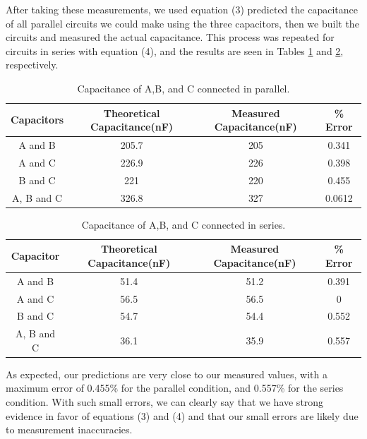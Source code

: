 \documentclass[oneside,12pt]{amsart}
\begin{document}
	\indent After taking these measurements, we used equation (3) predicted the capacitance of all parallel circuits we could make using the three capacitors, then we built the circuits and measured the actual capacitance. This process was repeated for circuits in series with equation (4), and the results are seen in Tables \ref{inParallel} and \ref{inSeries}, respectively. 
	\begin{table}[H]
		\begin{tabular}{ |c|c|c|c|}
			\hline
			Capacitors & Theoretical Capacitance(nF)& Measured Capacitance(nF) &\% Error\\
			\hline
			A and B	&205.7&205&0.341\\
			A and C&226.9 & 226&0.398\\
			B and C&221&220&0.455\\
			A, B and C&326.8&327&0.0612\\
			\hline
		\end{tabular}
		\caption{Capacitance of A,B, and C connected in parallel.}
		\label{inParallel}
	\end{table}

\begin{table}[H]
	\begin{tabular}{ |c|c|c|c|}
		\hline
		Capacitor & Theoretical Capacitance(nF)& Measured Capacitance(nF) &\% Error\\
		\hline
		A and B&51.4&51.2&0.391\\
		A and C&56.5&56.5&0\\
		B and C&54.7&54.4&0.552\\
		A, B and C&36.1&35.9&0.557\\
		\hline
	\end{tabular}
	\caption{Capacitance of A,B, and C connected in series.}
	\label{inSeries}
\end{table}
	
	As expected, our predictions are very close to our measured values, with a maximum error of 0.455\% for the parallel condition, and 0.557\% for the series condition. With such small errors, we can clearly say that we have strong evidence in favor of equations (3) and (4) and that our small errors are likely due to measurement inaccuracies. 
	\newpage
	
\printbibliography
	 
	
\end{document}
